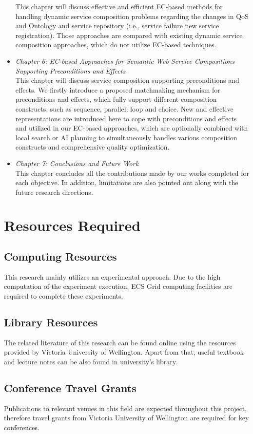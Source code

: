 \begin{itemize}
This chapter will discuss effective and efficient EC-based methods for handling dynamic service composition problems regarding the changes in QoS and Ontology and service repository (i.e., service failure new service registration). Those approaches are compared with existing dynamic service composition approaches, which do not utilize EC-based techniques.
 \item \textit{Chapter 6: EC-based Approaches for Semantic Web Service Compositions Supporting Preconditions and Effects}\\
This chapter will discuss service composition supporting preconditions and effects. We firstly introduce a proposed matchmaking mechanism for preconditions and effects, which fully support different composition constructs, such as sequence, parallel, loop and choice. New and effective representations are introduced here to cope with preconditions and effects and utilized in our EC-based approaches, which are optionally combined with local search or AI planning to simultaneously handles various composition constructs and comprehensive quality optimization. 
\item \textit{Chapter 7: Conclusions and Future Work}\\
This chapter concludes all the contributions made by our works completed for each objective. In addition, limitations are also pointed out along with the future research directions.
\end{itemize}


\section{Resources Required}

\subsection{Computing Resources}
This research mainly utilizes an experimental approach. Due to the high computation of the experiment execution, ECS Grid computing facilities are required to complete these experiments.

\subsection{Library Resources}
The related literature of this research can be found online using the resources provided by Victoria University of Wellington. Apart from that, useful textbook and lecture notes can be also found in university's library.

\subsection{Conference Travel Grants}
Publications to relevant venues in this field are expected throughout this project, therefore travel grants from Victoria University of Wellington are required for key conferences.